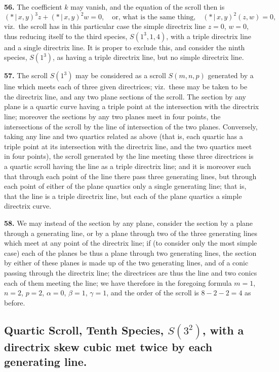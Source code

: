 \documentclass[11pt,a4paper]{article}
\begin{document}
\textbf{56.} The coefficient $k$ may vanish, and the equation of the scroll then is
\[
(* \,\vert\, x, y)^3 z + (* \,\vert\, x, y)^2 w = 0, \quad \text{or, what is the same thing,} \quad (* \,\vert\, x, y)^2 (z, w) = 0,
\]
viz.\ the scroll has in this particular case the simple directrix line $z=0$, $w=0$, thus reducing itself to the third species, $S(1^3, 1, 4)$, with a triple directrix line and a single directrix line. It is proper to exclude this, and consider the ninth species, $S(1^3)$, as having a triple directrix line, but no simple directrix line.

\textbf{57.} The scroll $S(1^3)$ may be considered as a scroll $S(m, n, p)$ generated by a line which meets each of three given directrices; viz.\ these may be taken to be the directrix line, and any two plane sections of the scroll. The section by any plane is a quartic curve having a triple point at the intersection with the directrix line; moreover the sections by any two planes meet in four points, the intersections of the scroll by the line of intersection of the two planes. Conversely, taking any line and two quartics related as above (that is, each quartic has a triple point at its intersection with the directrix line, and the two quartics meet in four points), the scroll generated by the line meeting these three directrices is a quartic scroll having the line as a triple directrix line; and it is moreover such that through each point of the line there pass three generating lines, but through each point of either of the plane quartics only a single generating line; that is, that the line is a triple directrix line, but each of the plane quartics a simple directrix curve.

\textbf{58.} We may instead of the section by any plane, consider the section by a plane through a generating line, or by a plane through two of the three generating lines which meet at any point of the directrix line; if (to consider only the most simple case) each of the planes be thus a plane through two generating lines, the section by either of these planes is made up of the two generating lines, and of a conic passing through the directrix line; the directrices are thus the line and two conics each of them meeting the line; we have therefore in the foregoing formula $m=1$, $n=2$, $p=2$, $\alpha=0$, $\beta=1$, $\gamma=1$, and the order of the scroll is $8-2-2=4$ as before.

\subsection*{Quartic Scroll, Tenth Species, $S(3^2)$, with a directrix skew cubic met twice by each generating line.}
\end{document}

